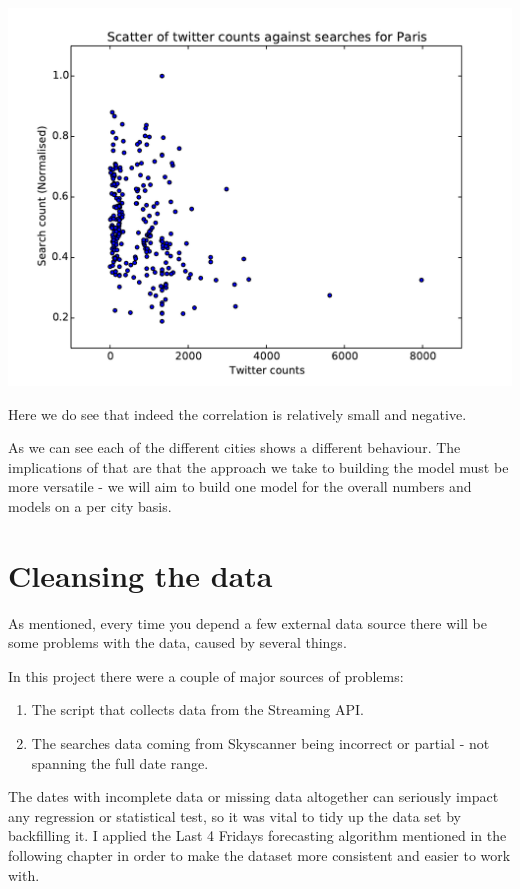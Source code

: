 \documentclass[minf,frontabs,twoside,singlespacing,parskip]{infthesis} %
\begin{document}
\includegraphics[width=\textwidth]{Paris}

Here we do see that indeed the correlation is relatively small and negative. 

As we can see each of the different cities shows a different behaviour. The implications of that are that the approach we take to building the model must be more versatile - we will aim to build one model for the overall numbers and models on a per city basis.

\section{Cleansing the data}

As mentioned, every time you depend a few external data source there will be some problems with the data, caused by several things. 

In this project there were a couple of major sources of problems:
\begin{enumerate}
\item The script that collects data from the Streaming API.
\item The searches data coming from Skyscanner being incorrect or partial - not spanning the full date range.
\end{enumerate}

The dates with incomplete data or missing data altogether can seriously impact any regression or statistical test, so it was vital to tidy up the data set by backfilling it. I applied the Last 4 Fridays forecasting algorithm mentioned in the following chapter in order to make the dataset more consistent and easier to work with. 
\end{document}
